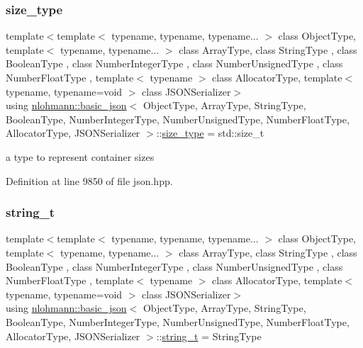 \subsubsection{\texorpdfstring{size\+\_\+type}{size\_type}}
{\footnotesize\ttfamily template$<$template$<$ typename, typename, typename... $>$ class Object\+Type, template$<$ typename, typename... $>$ class Array\+Type, class String\+Type , class Boolean\+Type , class Number\+Integer\+Type , class Number\+Unsigned\+Type , class Number\+Float\+Type , template$<$ typename $>$ class Allocator\+Type, template$<$ typename, typename=void $>$ class J\+S\+O\+N\+Serializer$>$ \\
using \hyperlink{classnlohmann_1_1basic__json}{nlohmann\+::basic\+\_\+json}$<$ Object\+Type, Array\+Type, String\+Type, Boolean\+Type, Number\+Integer\+Type, Number\+Unsigned\+Type, Number\+Float\+Type, Allocator\+Type, J\+S\+O\+N\+Serializer $>$\+::\hyperlink{classnlohmann_1_1basic__json_a39f2cd0b58106097e0e67bf185cc519b}{size\+\_\+type} =  std\+::size\+\_\+t}



a type to represent container sizes 



Definition at line 9850 of file json.\+hpp.

\mbox{\label{classnlohmann_1_1basic__json_a61f8566a1a85a424c7266fb531dca005}} 
\subsubsection{\texorpdfstring{string\+\_\+t}{string\_t}}
{\footnotesize\ttfamily template$<$template$<$ typename, typename, typename... $>$ class Object\+Type, template$<$ typename, typename... $>$ class Array\+Type, class String\+Type , class Boolean\+Type , class Number\+Integer\+Type , class Number\+Unsigned\+Type , class Number\+Float\+Type , template$<$ typename $>$ class Allocator\+Type, template$<$ typename, typename=void $>$ class J\+S\+O\+N\+Serializer$>$ \\
using \hyperlink{classnlohmann_1_1basic__json}{nlohmann\+::basic\+\_\+json}$<$ Object\+Type, Array\+Type, String\+Type, Boolean\+Type, Number\+Integer\+Type, Number\+Unsigned\+Type, Number\+Float\+Type, Allocator\+Type, J\+S\+O\+N\+Serializer $>$\+::\hyperlink{classnlohmann_1_1basic__json_a61f8566a1a85a424c7266fb531dca005}{string\+\_\+t} =  String\+Type}



